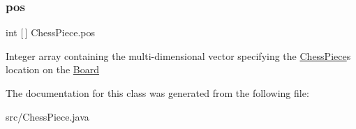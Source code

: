 \subsubsection{\texorpdfstring{pos}{pos}}
{\footnotesize\ttfamily int \mbox{[}$\,$\mbox{]} Chess\+Piece.\+pos\hspace{0.3cm}{\ttfamily [protected]}}

Integer array containing the multi-\/dimensional vector specifying the \mbox{\hyperlink{class_chess_piece}{Chess\+Piece}}\textquotesingle{}s location on the \mbox{\hyperlink{class_board}{Board}} 

The documentation for this class was generated from the following file\+:\begin{DoxyCompactItemize}
\item 
src/Chess\+Piece.\+java\end{DoxyCompactItemize}
